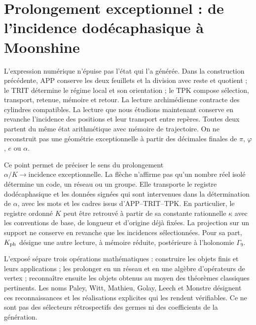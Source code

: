 \section{Prolongement exceptionnel : de l'incidence dodécaphasique à Moonshine}
\label{x_reciprocidad:exc:seccion}

L'expression numérique n'épuise pas l'état qui l'a générée. Dans la construction précédente, APP conserve les deux feuillets et la division avec reste et quotient ; le TRIT détermine le régime local et son orientation ; le TPK compose sélection, transport, retenue, mémoire et retour. La lecture archimédienne contracte des cylindres compatibles. La lecture que nous étudions maintenant conserve en revanche l'incidence des positions et leur transport entre repères. Toutes deux partent du même état arithmétique avec mémoire de trajectoire. On ne reconstruit pas une géométrie exceptionnelle à partir des décimales finales de $\pi$, $\varphi$, $e$ ou $\alpha$.

Ce point permet de préciser le sens du prolongement
$\alpha/K\longrightarrow\text{incidence exceptionnelle}$. La flèche
n'affirme pas qu'un nombre réel isolé détermine un code, un réseau ou un
groupe. Elle transporte le registre dodécaphasique et les données signées qui sont
intervenues dans la détermination de $\alpha$, avec les mots et les
cadres issus d'APP--TRIT--TPK. En particulier, le registre ordonné
$K$ peut être retrouvé à partir de sa constante rationnelle $\kappa$ avec les
conventions de base, de longueur et d'origine déjà fixées. La projection sur un
support ne conserve en revanche que les incidences sélectionnées.
Pour sa part, $K_{\rm ph}$
désigne une autre lecture, à mémoire réduite, postérieure à l'holonomie
$\Gamma_9$.

L'exposé sépare trois opérations mathématiques : construire les objets
finis et leurs applications ; les prolonger en un réseau et en une algèbre d'opérateurs
de vertex ; reconnaître ensuite les objets obtenus au moyen des théorèmes
classiques pertinents. Les noms Paley, Witt, Mathieu, Golay, Leech et
Monstre désignent ces reconnaissances et les réalisations explicites
qui les rendent vérifiables. Ce ne sont pas des sélecteurs rétrospectifs des
germes ni des coefficients de la génération.


